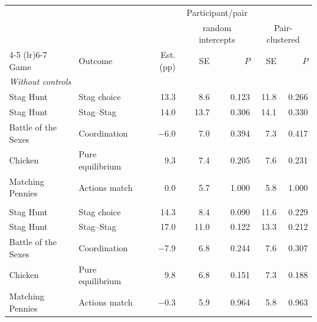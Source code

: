\small
\begin{tabular}{llrrrrr}
\toprule
 & & & \multicolumn{2}{c}{Participant/pair} & \\
 & & & \multicolumn{2}{c}{random intercepts} & \multicolumn{2}{c}{Pair-clustered} \\
\cmidrule(lr){4-5} \cmidrule(lr){6-7}
Game & Outcome & Est. (pp) & SE & $P$ & SE & $P$ \\
\midrule
\multicolumn{7}{l}{\textit{Without controls}} \\
Stag Hunt & Stag choice & 13.3 & 8.6 & 0.123 & 11.8 & 0.266 \\
Stag Hunt & Stag--Stag & 14.0 & 13.7 & 0.306 & 14.1 & 0.330 \\
Battle of the Sexes & Coordination & $-$6.0 & 7.0 & 0.394 & 7.3 & 0.417 \\
Chicken & Pure equilibrium & 9.3 & 7.4 & 0.205 & 7.6 & 0.231 \\
Matching Pennies & Actions match & 0.0 & 5.7 & 1.000 & 5.8 & 1.000 \\
\addlinespace
\multicolumn{7}{l}{\textit{With controls}} \\
Stag Hunt & Stag choice & 14.3 & 8.4 & 0.090 & 11.6 & 0.229 \\
Stag Hunt & Stag--Stag & 17.0 & 11.0 & 0.122 & 13.3 & 0.212 \\
Battle of the Sexes & Coordination & $-$7.9 & 6.8 & 0.244 & 7.6 & 0.307 \\
Chicken & Pure equilibrium & 9.8 & 6.8 & 0.151 & 7.3 & 0.188 \\
Matching Pennies & Actions match & $-$0.3 & 5.9 & 0.964 & 5.8 & 0.963 \\
\bottomrule
\end{tabular}
